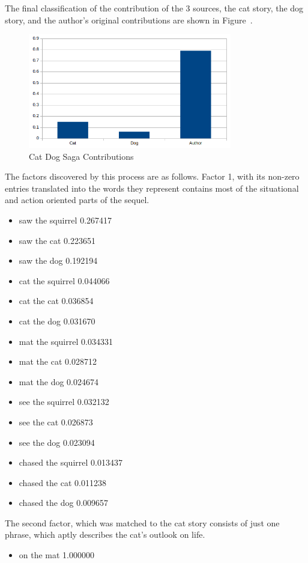 \documentclass[../ut-dissertation.tex]{subfiles}
\begin{document}
The final classification of the contribution of the 3 sources, the cat
story, the dog story, and the author's original contributions are
shown in Figure~\cite{fig:cat_dog_bar}.

\begin{figure}
  \centering
  \includegraphics[width=3.5in]{diagrams/catdog}
  \caption{Cat Dog Saga Contributions}
\end{figure}

The factors discovered by this process are as follows.  Factor 1, with
its non-zero entries translated into the words they represent contains
most of the situational and action oriented parts of the sequel.
\begin{itemize}
\item saw the squirrel 0.267417
\item saw the cat 0.223651
\item saw the dog 0.192194
\item cat the squirrel 0.044066
\item cat the cat 0.036854
\item cat the dog 0.031670
\item mat the squirrel 0.034331
\item mat the cat 0.028712
\item mat the dog 0.024674
\item see the squirrel 0.032132
\item see the cat 0.026873
\item see the dog 0.023094
\item chased the squirrel 0.013437
\item chased the cat 0.011238
\item chased the dog 0.009657
\end{itemize}

The second factor, which was matched to the cat story consists of just
one phrase, which aptly describes the cat's outlook on life.
\begin{itemize}
\item on the mat 1.000000
\end{itemize}
\end{document}
